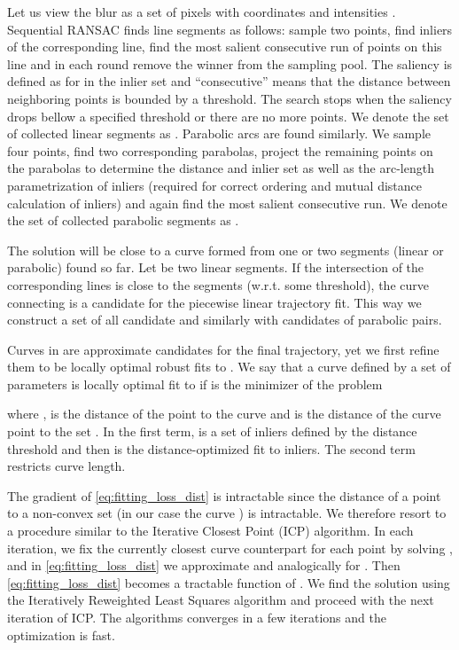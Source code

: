 \documentclass[10pt,twocolumn,letterpaper]{article}
\begin{document}
Let us view the blur  as a set of pixels with coordinates  and intensities . Sequential RANSAC finds line segments as follows: sample two points, find inliers of the corresponding line, find the most salient consecutive run of points on this line and in each round remove the winner from the sampling pool.
The saliency is defined as  for  in the inlier set and ``consecutive'' means that the distance between neighboring points is bounded by a threshold.
The search stops when the saliency drops bellow a specified threshold or there are no more points.
We denote the set of collected linear segments as . Parabolic arcs are found similarly. We sample four points, find two corresponding parabolas, project the remaining points on the parabolas to determine the distance and inlier set as well as the arc-length parametrization of inliers (required for correct ordering and mutual distance calculation of inliers) and again find the most salient consecutive run. 
We denote the set of collected parabolic segments as .

The solution will be close to a curve formed from one or two segments (linear or parabolic) found so far. Let  be two linear segments. If the intersection  of the corresponding lines is close to the segments (w.r.t. some threshold), the curve connecting  is a candidate for the piecewise linear trajectory fit. This way we construct a set  of all candidate and similarly  with candidates of parabolic pairs.

Curves in  are approximate candidates for the final trajectory, yet we first refine them to be locally optimal robust fits to . We say that a curve  defined by a set of parameters  is locally optimal fit to  if  is the minimizer of the problem

where ,  is the distance of the point  to the curve  and  is the distance of the curve point  to the set . In the first term,  is a set of inliers defined by the distance threshold  and then  is the distance-optimized fit to inliers. The second term restricts curve length.

The gradient of \eqref{eq:fitting_loss_dist} is intractable since the distance of a point  to a non-convex set (in our case the curve ) is intractable. We therefore resort to a procedure similar to the Iterative Closest Point (ICP) algorithm. In each iteration, we fix the currently closest curve counterpart  for each point  by solving , and in \eqref{eq:fitting_loss_dist} we approximate  and analogically for . Then \eqref{eq:fitting_loss_dist} becomes a tractable function of . We find the solution using the Iteratively Reweighted Least Squares algorithm and proceed with the next iteration of ICP.
The algorithms converges in a few iterations and the optimization is fast.
\end{document}
